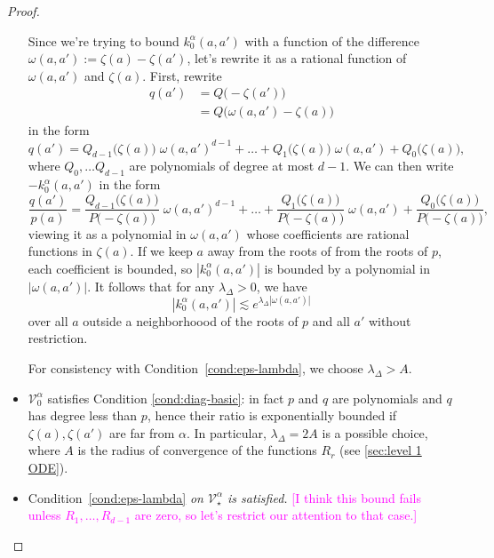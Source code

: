 \documentclass{article}
\theoremstyle{plain}
\newcommand{\hardpart}{\mathcal{V}_0}
\newcommand{\softpart}{\mathcal{V}_\star}
\newcommand{\hardker}{k_0}
\begin{document}
\begin{proof}
\begin{itemize}
Since we're trying to bound $\hardker^\alpha(a, a')$ with a function of the difference $\omega(a, a') := \zeta(a) - \zeta(a')$, let's rewrite it as a rational function of $\omega(a, a')$ and $\zeta(a)$. First, rewrite
\begin{align*}
q(a') & = Q\big(-\zeta(a')\big) \\
& = Q\big(\omega(a, a') - \zeta(a)\big)
\end{align*}
in the form
\[ q(a') = Q_{d-1}\big(\zeta(a)\big)\;\omega(a, a')^{d-1} + \ldots + Q_1\big(\zeta(a)\big)\;\omega(a, a') + Q_0\big(\zeta(a)\big), \]
where $Q_0, \ldots Q_{d-1}$ are polynomials of degree at most $d-1$. We can then write $-\hardker^\alpha(a, a')$ in the form
\[ \frac{q(a')}{p(a)} = \frac{Q_{d-1}\big(\zeta(a)\big)}{P\big(-\zeta(a)\big)}\;\omega(a, a')^{d-1} + \ldots + \frac{Q_1\big(\zeta(a)\big)}{P\big(-\zeta(a)\big)}\;\omega(a, a') + \frac{Q_0\big(\zeta(a)\big)}{P\big(-\zeta(a)\big)}, \]
viewing it as a polynomial in $\omega(a, a')$ whose coefficients are rational functions in $\zeta(a)$. If we keep $a$ away from the roots of from the roots of $p$, each coefficient is bounded, so $|\hardker^\alpha(a, a')|$ is bounded by a polynomial in $|\omega(a, a')|$. It follows that for any $\lambda_\Delta > 0$, we have
\[ |\hardker^\alpha(a, a')| \lesssim e^{\lambda_\Delta|\omega(a, a')|} \]
over all $a$ outside a neighborhoood of the roots of $p$ and all $a'$ without restriction.

For consistency with Condition~\eqref{cond:eps-lambda}, we choose $\lambda_\Delta > A$.
\color{RoyalBlue}
\item $\hardpart^\alpha$ satisfies Condition \eqref{cond:diag-basic}: in fact $p$ and $q$ are polynomials and $q$ has degree less than $p$, hence their ratio is exponentially bounded if $\zeta(a), \zeta(a')$ are far from $\alpha$. In particular, $\lambda_\Delta=2A$ is a possible choice, where $A$ is the radius of convergence of the functions $R_r$ (see \ref{sec:level 1 ODE}).
\color{black}
\item Condition~\eqref{cond:eps-lambda} {\em on $\softpart^\alpha$ is satisfied.} \textcolor{magenta}{[I think this bound fails unless $R_1, \ldots, R_{d-1}$ are zero, so let's restrict our attention to that case.]}


\end{itemize}
\end{proof}
\end{document}
